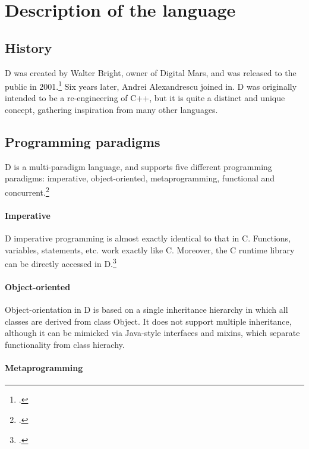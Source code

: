 \section{Description of the language} \label{sec:description_of_the_language}

\subsection{History} \label{subsec:history}

D was created by Walter Bright, owner of Digital Mars, and was released to the public in 2001.\footcite{d_change_log}
Six years later, Andrei Alexandrescu joined in.
D was originally intended to be a re-engineering of C++, but it is quite a distinct and unique concept, gathering inspiration from many other languages.

\subsection{Programming paradigms} \label{subsec:programming_paradigms}

D is a multi-paradigm language, and supports five different programming paradigms: imperative, object-oriented, metaprogramming, functional and concurrent.\footcite{wikipedia_page}

\paragraph{Imperative}

D imperative programming is almost exactly identical to that in C. Functions, variables, statements, etc. work exactly like C. Moreover, the C runtime library can be directly accessed in D.\footcite{interface_to_c}

\paragraph{Object-oriented}

Object-orientation in D is based on a single inheritance hierarchy in which all classes are derived from class Object. It does not support multiple inheritance, although it can be mimicked via Java-style interfaces and mixins, which separate functionality from class hierachy.

\paragraph{Metaprogramming}

